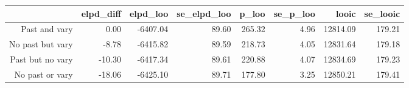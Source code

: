 \begin{table}[ht]
\centering
\begin{tabular}{rrrrrrrr}
  \hline
 & elpd\_diff & elpd\_loo & se\_elpd\_loo & p\_loo & se\_p\_loo & looic & se\_looic \\ 
  \hline
Past and vary & 0.00 & -6407.04 & 89.60 & 265.32 & 4.96 & 12814.09 & 179.21 \\ 
  No past but vary & -8.78 & -6415.82 & 89.59 & 218.73 & 4.05 & 12831.64 & 179.18 \\ 
  Past but no vary & -10.30 & -6417.34 & 89.61 & 220.88 & 4.07 & 12834.69 & 179.23 \\ 
  No past or vary & -18.06 & -6425.10 & 89.71 & 177.80 & 3.25 & 12850.21 & 179.41 \\ 
   \hline
\end{tabular}
\end{table}

